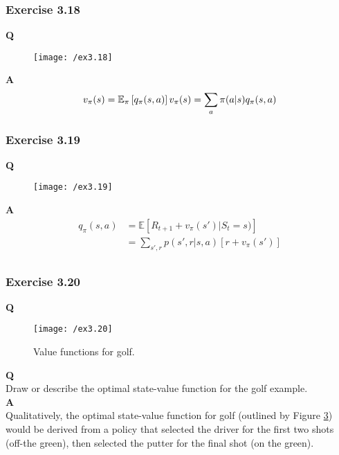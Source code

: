 \subsubsection{Exercise 3.18}
\textbf{Q}\\
\begin{figure}[h!]
	\centering
	\texttt{[image: /ex3.18]}
	\label{fig:3.18}
\end{figure}

\textbf{A}\\
\begin{equation}
v_\pi(s) = \mathbb{E}_\pi \left[q_\pi(s,a)\right] \\
v_\pi(s) = \sum_{a} \pi(a|s) q_\pi(s,a)
\end{equation}

\subsubsection{Exercise 3.19}
\textbf{Q}\\
\begin{figure}[h!]
	\centering
	\texttt{[image: /ex3.19]}
	\label{fig:3.19}
\end{figure}

\textbf{A}\\
\begin{align}
q_\pi(s, a) &= \mathbb{E} \left[R_{t+1} + v_\pi(s') | S_{t} = s)\right] \\
&= \sum_{s', r} p(s', r | s, a) [r +v_\pi(s')]\\
\end{align}

\subsubsection{Exercise 3.20}
\textbf{Q}\\
\begin{figure}[h!]
	\centering
	\texttt{[image: /ex3.20]}
	\caption{Value functions for golf.}
	\label{fig:3.20}
\end{figure}
\textbf{Q}\\
Draw or describe the optimal state-value function for the golf example.\\

\textbf{A}\\
Qualitatively, the optimal state-value function for golf (outlined by Figure \ref{fig:3.20}) would be derived from a policy that selected the driver for the first two shots (off-the green), then selected the putter for the final shot (on the green).

